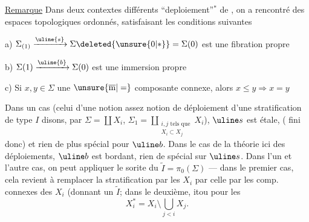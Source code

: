 \uline{Remarque} Dans deux contextes différents
``deploiement''$^{*}$ de  , on
a rencontré des espaces topologiques ordonnés\inserted{$\Sigma$},
satisfaisant les conditions suivantes


a) $\Sigma_{(1)}\xrightarrow{\uline{s}}\Sigma\deleted{\unsure{0|*}}=\Sigma(0)$
est une fibration propre

b) $\Sigma(1)\xrightarrow{\uline{b}}\Sigma(0)$ est une immersion propre

c) Si $x,y\in\Sigma$   une $\unsure{\overline{\mathrm m}|=}$ composante connexe,
alors $x\leq y\Longrightarrow x=y$


Dans un cas (celui d'une notion assez \unsure{)}
 notion de déploiement d'une stratification de type $I$ disons,
par $\Sigma=\coprod X_i$,
$\Sigma_1=\displaystyle\coprod_{\substack{i,j\text{ tels que}\\X_i\subset X_j}}X_i$),
$\uline s$ est étale, ( fini donc) et rien de plus spécial pour $\uline b$.
Dans le cas de la théorie 
ici des déploiements,
$\uline b$ est bordant, rien de spécial sur $\uline s$.
Dans l'un et l'autre cas, on peut appliquer le sorite
du $\widetilde I=\pi_0(\Sigma)$ --- dans le premier cas,
cela revient à remplacer la stratification par les $X_i$ par celle
par les comp. connexes des $X_i$ (donnant un $\widetilde I$;
dans le deuxième,
itou pour les
\[
X_i^{*}=X_i\setminus\bigcup_{j<i}X_j.
\]
